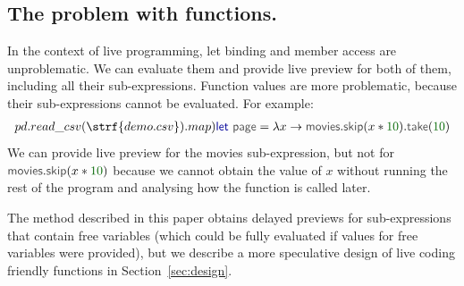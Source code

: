 \documentclass[acmsmall,anonymous,fleqn]{acmart}\settopmatter{printfolios=false,printccs=false,printacmref=false}
\theoremstyle{plain}
\theoremstyle{definition}
\newcommand{\num}[1]{\textcolor{numclr}{#1}}
\newcommand{\ident}[1]{\textnormal{\textcolor{idclr}{\sffamily #1}}}
\newcommand{\kvd}[1]{\textnormal{\textcolor{kvdclr}{\sffamily #1}}}
\begin{document}

\subsection{The problem with functions.}
In the context of live programming, \kvd{let} binding and member access are unproblematic.
We can evaluate them and provide live preview for both of them, including all their sub-expressions.
Function values are more problematic, because their sub-expressions cannot be evaluated. For example:
%
\begin{equation*}
\begin{array}{l}
pd.read\_csv(\strf{demo.csv}).map)
\kvd{let}~\ident{page} = \lambda x \rightarrow \ident{movies}.\ident{skip}(x*\num{10}).\ident{take}(\num{10})
\end{array}
\end{equation*}
%
We can provide live preview for the \ident{movies} sub-expression, but not for
$\ident{movies}.\ident{skip}(x*\num{10})$ because we cannot obtain the value of $x$ without
running the rest of the program and analysing how the function is called later.

The method described in this paper obtains delayed previews for sub-expressions that contain
free variables (which could be fully evaluated if values for free variables were provided), but
we describe a more speculative design of live coding friendly functions in Section~\ref{sec:design}.
\end{document}
